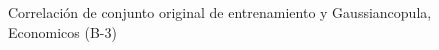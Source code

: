 \begin{figure}[H]
    \centering
    
    \caption{Correlación de conjunto original de entrenamiento y Gaussiancopula, Economicos (B-3)}
    \label{pairwise-economicos-b-3-gaussiancopula}
\end{figure}